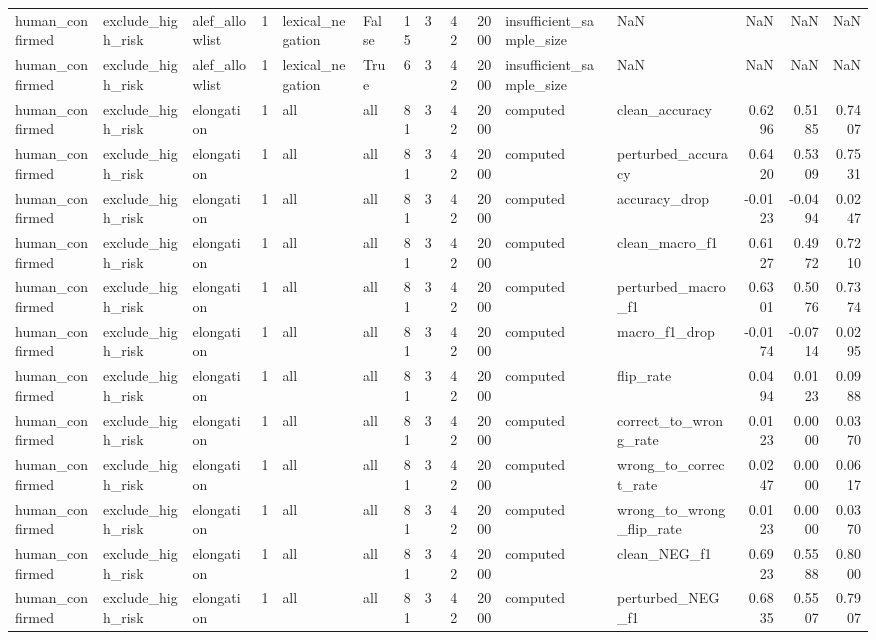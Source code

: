 \begin{tabular}{lllrllrrrrllrrr}
human_confirmed & exclude_high_risk & alef_allowlist & 1 & lexical_negation & False & 15 & 3 & 42 & 2000 & insufficient_sample_size & NaN & NaN & NaN & NaN \\
human_confirmed & exclude_high_risk & alef_allowlist & 1 & lexical_negation & True & 6 & 3 & 42 & 2000 & insufficient_sample_size & NaN & NaN & NaN & NaN \\
human_confirmed & exclude_high_risk & elongation & 1 & all & all & 81 & 3 & 42 & 2000 & computed & clean_accuracy & 0.6296 & 0.5185 & 0.7407 \\
human_confirmed & exclude_high_risk & elongation & 1 & all & all & 81 & 3 & 42 & 2000 & computed & perturbed_accuracy & 0.6420 & 0.5309 & 0.7531 \\
human_confirmed & exclude_high_risk & elongation & 1 & all & all & 81 & 3 & 42 & 2000 & computed & accuracy_drop & -0.0123 & -0.0494 & 0.0247 \\
human_confirmed & exclude_high_risk & elongation & 1 & all & all & 81 & 3 & 42 & 2000 & computed & clean_macro_f1 & 0.6127 & 0.4972 & 0.7210 \\
human_confirmed & exclude_high_risk & elongation & 1 & all & all & 81 & 3 & 42 & 2000 & computed & perturbed_macro_f1 & 0.6301 & 0.5076 & 0.7374 \\
human_confirmed & exclude_high_risk & elongation & 1 & all & all & 81 & 3 & 42 & 2000 & computed & macro_f1_drop & -0.0174 & -0.0714 & 0.0295 \\
human_confirmed & exclude_high_risk & elongation & 1 & all & all & 81 & 3 & 42 & 2000 & computed & flip_rate & 0.0494 & 0.0123 & 0.0988 \\
human_confirmed & exclude_high_risk & elongation & 1 & all & all & 81 & 3 & 42 & 2000 & computed & correct_to_wrong_rate & 0.0123 & 0.0000 & 0.0370 \\
human_confirmed & exclude_high_risk & elongation & 1 & all & all & 81 & 3 & 42 & 2000 & computed & wrong_to_correct_rate & 0.0247 & 0.0000 & 0.0617 \\
human_confirmed & exclude_high_risk & elongation & 1 & all & all & 81 & 3 & 42 & 2000 & computed & wrong_to_wrong_flip_rate & 0.0123 & 0.0000 & 0.0370 \\
human_confirmed & exclude_high_risk & elongation & 1 & all & all & 81 & 3 & 42 & 2000 & computed & clean_NEG_f1 & 0.6923 & 0.5588 & 0.8000 \\
human_confirmed & exclude_high_risk & elongation & 1 & all & all & 81 & 3 & 42 & 2000 & computed & perturbed_NEG_f1 & 0.6835 & 0.5507 & 0.7907 \\

\end{tabular}
